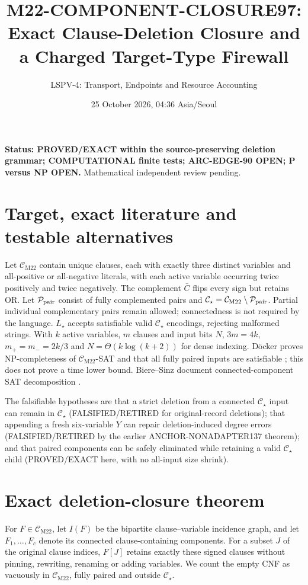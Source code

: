 \documentclass[11pt]{article}
\title{M22-COMPONENT-CLOSURE97: Exact Clause-Deletion Closure and a Charged Target-Type Firewall}
\author{LSPV-4: Transport, Endpoints and Resource Accounting}
\date{25 October 2026, 04:36 Asia/Seoul}
\newcommand{\CM}{\mathcal C_{\mathrm{M22}}}
\newcommand{\CS}{\mathcal C_{\star}}
\begin{document}
\maketitle
\noindent\textbf{Status: PROVED/EXACT within the source-preserving deletion grammar; COMPUTATIONAL finite tests; ARC-EDGE-90 OPEN; P versus NP OPEN.} Mathematical independent review pending.

\section{Target, exact literature and testable alternatives}
Let $\CM$ contain unique clauses, each with exactly three distinct variables and all-positive or all-negative literals, with each active variable occurring twice positively and twice negatively. The complement $\bar C$ flips every sign but retains OR. Let $\mathcal P_{\rm pair}$ consist of fully complemented pairs and $\CS=\CM\setminus\mathcal P_{\rm pair}$. Partial individual complementary pairs remain allowed; connectedness is not required by the language. $L_\star$ accepts satisfiable valid $\CS$ encodings, rejecting malformed strings. With $k$ active variables, $m$ clauses and input bits $N$, $3m=4k$, $m_+=m_-=2k/3$ and $N=\Theta(k\log(k+2))$ for dense indexing. D\"ocker proves NP-completeness of $\CM$-SAT and that all fully paired inputs are satisfiable \cite{docker}; this does not prove a time lower bound. Biere--Sinz document connected-component SAT decomposition \cite{biere}.

The falsifiable hypotheses are that a strict deletion from a connected $\CS$ input can remain in $\CS$ (FALSIFIED/RETIRED for original-record deletions); that appending a fresh six-variable $Y$ can repair deletion-induced degree errors (FALSIFIED/RETIRED by the earlier ANCHOR-NONADAPTER137 theorem); and that paired components can be safely eliminated while retaining a valid $\CS$ child (PROVED/EXACT here, with no all-input size shrink).

\section{Exact deletion-closure theorem}
For $F\in\CM$, let $I(F)$ be the bipartite clause--variable incidence graph, and let $F_1,\ldots,F_c$ denote its connected clause-containing components. For a subset $J$ of the original clause indices, $F[J]$ retains exactly these signed clauses without pinning, rewriting, renaming or adding variables. We count the empty CNF as vacuously in $\CM$, fully paired and outside $\CS$.
\end{document}
